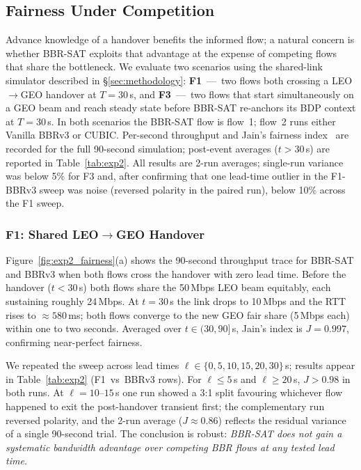 \documentclass[conference]{IEEEtran}
\begin{document}
\subsection{Fairness Under Competition}
\label{sec:fairness}

Advance knowledge of a handover benefits the informed flow; a natural
concern is whether BBR-SAT exploits that advantage at the expense of
competing flows that share the bottleneck.
We evaluate two scenarios using the shared-link simulator described in
\S\ref{sec:methodology}:
\textbf{F1}~---~two flows both crossing a LEO$\to$GEO handover at $T=30$\,s,
and
\textbf{F3}~---~two flows that start simultaneously on a GEO beam
and reach steady state before BBR-SAT re-anchors its BDP context at
$T=30$\,s.
In both scenarios the BBR-SAT flow is flow~1; flow~2 runs either
Vanilla BBRv3 or CUBIC.
Per-second throughput and Jain's fairness index~\cite{jain1984} are
recorded for the full 90-second simulation; post-event averages
($t > 30$\,s) are reported in Table~\ref{tab:exp2}.
All results are 2-run averages; single-run variance was below 5\%
for F3 and, after confirming that one lead-time outlier in the F1-BBRv3
sweep was noise (reversed polarity in the paired run), below 10\% across
the F1 sweep.

\subsubsection{F1: Shared LEO$\to$GEO Handover}

Figure~\ref{fig:exp2_fairness}(a) shows the 90-second throughput trace for
BBR-SAT and BBRv3 when both flows cross the handover with zero lead time.
Before the handover ($t < 30$\,s) both flows share the 50\,Mbps LEO
beam equitably, each sustaining roughly 24\,Mbps.
At $t = 30$\,s the link drops to 10\,Mbps and the RTT rises to
$\approx580$\,ms; both flows converge to the new GEO fair share
(5\,Mbps each) within one to two seconds.
Averaged over $t \in (30, 90]$\,s, Jain's index is $J = 0.997$,
confirming near-perfect fairness.

We repeated the sweep across lead times
$\ell \in \{0, 5, 10, 15, 20, 30\}\,$s; results appear in
Table~\ref{tab:exp2} (F1~vs~BBRv3 rows).
For $\ell \leq 5$\,s and $\ell \geq 20$\,s, $J > 0.98$ in both runs.
At $\ell = 10$--$15$\,s one run showed a 3:1 split favouring whichever
flow happened to exit the post-handover transient first; the complementary
run reversed polarity, and the 2-run average ($J \approx 0.86$) reflects
the residual variance of a single 90-second trial.
The conclusion is robust: \emph{BBR-SAT does not gain a systematic
bandwidth advantage over competing BBR flows at any tested lead time.}
\end{document}
